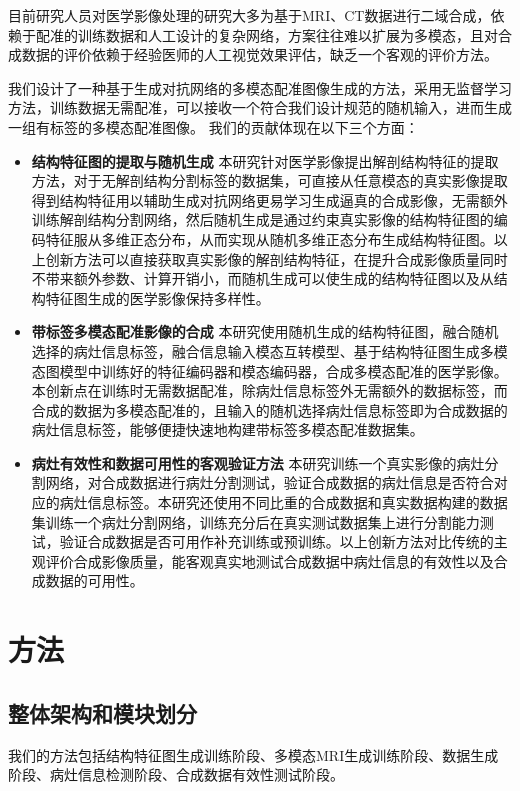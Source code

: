 \documentclass[letterpaper]{article} %
\begin{document}
目前研究人员对医学影像处理的研究大多为基于MRI、CT数据进行二域合成，依赖于配准的训练数据和人工设计的复杂网络，方案往往难以扩展为多模态，且对合成数据的评价依赖于经验医师的人工视觉效果评估，缺乏一个客观的评价方法。

我们设计了一种基于生成对抗网络的多模态配准图像生成的方法，采用无监督学习方法，训练数据无需配准，可以接收一个符合我们设计规范的随机输入，进而生成一组有标签的多模态配准图像。
我们的贡献体现在以下三个方面：
\begin{itemize}
\item \textbf{结构特征图的提取与随机生成}
本研究针对医学影像提出解剖结构特征的提取方法，对于无解剖结构分割标签的数据集，可直接从任意模态的真实影像提取得到结构特征用以辅助生成对抗网络更易学习生成逼真的合成影像，无需额外训练解剖结构分割网络，然后随机生成是通过约束真实影像的结构特征图的编码特征服从多维正态分布，从而实现从随机多维正态分布生成结构特征图。以上创新方法可以直接获取真实影像的解剖结构特征，在提升合成影像质量同时不带来额外参数、计算开销小，而随机生成可以使生成的结构特征图以及从结构特征图生成的医学影像保持多样性。
\item \textbf{带标签多模态配准影像的合成}
本研究使用随机生成的结构特征图，融合随机选择的病灶信息标签，融合信息输入模态互转模型、基于结构特征图生成多模态图模型中训练好的特征编码器和模态编码器，合成多模态配准的医学影像。本创新点在训练时无需数据配准，除病灶信息标签外无需额外的数据标签，而合成的数据为多模态配准的，且输入的随机选择病灶信息标签即为合成数据的病灶信息标签，能够便捷快速地构建带标签多模态配准数据集。
\item \textbf{病灶有效性和数据可用性的客观验证方法}
本研究训练一个真实影像的病灶分割网络，对合成数据进行病灶分割测试，验证合成数据的病灶信息是否符合对应的病灶信息标签。本研究还使用不同比重的合成数据和真实数据构建的数据集训练一个病灶分割网络，训练充分后在真实测试数据集上进行分割能力测试，验证合成数据是否可用作补充训练或预训练。以上创新方法对比传统的主观评价合成影像质量，能客观真实地测试合成数据中病灶信息的有效性以及合成数据的可用性。
\end{itemize}

\section{方法}
\subsection{整体架构和模块划分}
我们的方法包括结构特征图生成训练阶段、多模态MRI生成训练阶段、数据生成阶段、病灶信息检测阶段、合成数据有效性测试阶段。
\end{document}
